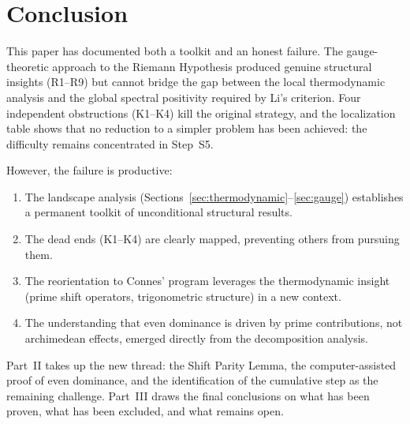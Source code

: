 \documentclass[12pt,a4paper]{article}
\theoremstyle{definition}
\theoremstyle{remark}
\begin{document}
\section{Conclusion}
\label{sec:conclusion}

This paper has documented both a toolkit and an honest failure. The gauge-theoretic approach to the Riemann Hypothesis produced genuine structural insights (R1--R9) but cannot bridge the gap between the local thermodynamic analysis and the global spectral positivity required by Li's criterion. Four independent obstructions (K1--K4) kill the original strategy, and the localization table shows that no reduction to a simpler problem has been achieved: the difficulty remains concentrated in Step~S5.

However, the failure is productive:
\begin{enumerate}
  \item The landscape analysis (Sections~\ref{sec:thermodynamic}--\ref{sec:gauge}) establishes a permanent toolkit of unconditional structural results.
  \item The dead ends (K1--K4) are clearly mapped, preventing others from pursuing them.
  \item The reorientation to Connes' program leverages the thermodynamic insight (prime shift operators, trigonometric structure) in a new context.
  \item The understanding that even dominance is driven by prime contributions, not archimedean effects, emerged directly from the decomposition analysis.
\end{enumerate}

Part~II takes up the new thread: the Shift Parity Lemma, the computer-assisted proof of even dominance, and the identification of the cumulative step as the remaining challenge. Part~III draws the final conclusions on what has been proven, what has been excluded, and what remains open.
\end{document}
